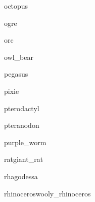 \documentclass[a4paper,serif]{module}
\begin{document}
\begin{newmonster}{octopus}\end{newmonster}

\begin{newmonster}{ogre}\end{newmonster}

\begin{newmonster}{orc}\end{newmonster}

\begin{newmonster}{owl_bear}\end{newmonster}

\begin{newmonster}{pegasus}\end{newmonster}

\begin{newmonster}{pixie}\end{newmonster}


\begin{newmonster}{pterodactyl}\end{newmonster}

\begin{newmonster}{pteranodon}\end{newmonster}

\begin{newmonster}{purple_worm}\end{newmonster}


\begin{newmonster2}{rat}{giant_rat}
\lipsum[1]
\end{newmonster2}

\begin{newmonster}{rhagodessa}\end{newmonster}


\begin{newmonster2}{rhinoceros}{wooly_rhinoceros}\end{newmonster2}
\end{document}
